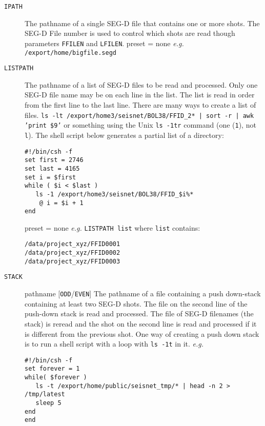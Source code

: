 \begin{description}
\item[\texttt{IPATH}] The pathname of a single SEG-D file that contains one or
          more \glspl{shot}.  The SEG-D File number is used to control which
          \glspl{shot} are read though parameters \texttt{FFILEN} and \texttt{LFILEN}.
          \Gls{preset} = none   \textit{e.g.} \texttt{/export/home/bigfile.segd}

\item[\texttt{LISTPATH}] The pathname of a list of SEG-D files to be read and
         processed.  Only one SEG-D file name may be on each line in
         the list.  The list is read in order from the first line to
         the last line.  There are many ways to create a list of files.
         \texttt{ls -lt /export/home3/seisnet/BOL38/FFID\_2* | sort -r | awk '{print \$9}'}
         or something using the Unix \texttt{ls -1tr} command (one (\texttt{1}), not \texttt{l}).
         The shell script below generates a partial list of a directory:
\lstset{language=csh}
\begin{lstlisting}
#!/bin/csh -f
set first = 2746
set last = 4165
set i = $first
while ( $i < $last )
   ls -1 /export/home3/seisnet/BOL38/FFID_$i%*
    @ i = $i + 1
end
\end{lstlisting}
         \Gls{preset} = none    \textit{e.g.} \texttt{LISTPATH list}     where \texttt{list} contains:
\begin{verbatim}
/data/project_xyz/FFID0001
/data/project_xyz/FFID0002
/data/project_xyz/FFID0003
\end{verbatim}

\item[\texttt{\texttt{STACK}}] pathname [\texttt{ODD}/\texttt{EVEN}]
         The pathname of a file containing a push down-stack
         containing at least two SEG-D \glspl{shot}.  The file on the second
         line of the push-down stack is read and processed.  The file of
         SEG-D filenames (the stack) is reread and the \gls{shot} on the second
         line is read and processed if it is different from the previous
         \gls{shot}.  One way of creating a push down stack is to run a shell
         script with a loop with \texttt{ls -1t} in it.  \textit{e.g.}
\lstset{language=csh}
\begin{lstlisting}
#!/bin/csh -f
set forever = 1
while( $forever )
   ls -t /export/home/public/seisnet_tmp/* | head -n 2 > /tmp/latest
   sleep 5
end
end
\end{lstlisting}


\end{description}
